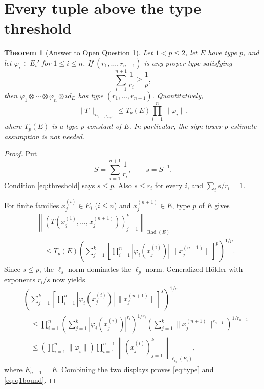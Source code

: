 \documentclass[11pt]{article}
\newtheorem{theorem}{Theorem}
\newcommand{\Rad}{\operatorname{Rad}}
\newcommand{\type}{\tau}
\begin{document}
\section{Every tuple above the type threshold}

\begin{theorem}[Answer to Open Question 1]\label{thm:q1}
Let $1<p\le2$, let $E$ have type $p$, and let
$\varphi_i\in E_i'$ for $1\le i\le n$.  If
$(r_1,\ldots,r_{n+1})$ is any proper type satisfying
\begin{equation}\label{eq:threshold}
 \sum_{i=1}^{n+1}\frac1{r_i}\ge\frac1p,
\end{equation}
then $\varphi_1\otimes\cdots\otimes\varphi_n\otimes id_E$ has type
$(r_1,\ldots,r_{n+1})$.  Quantitatively,
\begin{equation}\label{eq:q1bound}
 \|T\|_{\type_{r_1,\ldots,r_{n+1}}}
 \le T_p(E)\prod_{i=1}^n\|\varphi_i\|,
\end{equation}
where $T_p(E)$ is a type-$p$ constant of $E$.
In particular, the sign lower $p$-estimate assumption is not needed.
\end{theorem}

\begin{proof}
Put
\[
 S=\sum_{i=1}^{n+1}\frac1{r_i},\qquad s=S^{-1}.
\]
Condition \eqref{eq:threshold} says $s\le p$.  Also $s\le r_i$ for every
$i$, and $\sum_i s/r_i=1$.

For finite families $x_j^{(i)}\in E_i$ ($i\le n$) and
$x_j^{(n+1)}\in E$, type $p$ of $E$ gives
\begin{align*}
 &\left\|\left(T(x_j^{(1)},\ldots,x_j^{(n+1)})\right)_{j=1}^k
 \right\|_{\Rad(E)}\\
 &\quad\le T_p(E)
 \left(\sum_{j=1}^k
 \left[\prod_{i=1}^n|\varphi_i(x_j^{(i)})|\,
       \|x_j^{(n+1)}\|\right]^p\right)^{1/p}.
\end{align*}
Since $s\le p$, the $\ell_s$ norm dominates the $\ell_p$ norm.  Generalized
H\"older with exponents $r_i/s$ now yields
\begin{align*}
 &\left(\sum_{j=1}^k
 \left[\prod_{i=1}^n|\varphi_i(x_j^{(i)})|\,
       \|x_j^{(n+1)}\|\right]^s\right)^{1/s}\\
 &\quad\le
 \prod_{i=1}^n\left(\sum_{j=1}^k
 |\varphi_i(x_j^{(i)})|^{r_i}\right)^{1/r_i}
 \left(\sum_{j=1}^k\|x_j^{(n+1)}\|^{r_{n+1}}
 \right)^{1/r_{n+1}}\\
 &\quad\le\left(\prod_{i=1}^n\|\varphi_i\|\right)
 \prod_{i=1}^{n+1}
 \left\|(x_j^{(i)})_{j=1}^k\right\|_{\ell_{r_i}(E_i)},
\end{align*}
where $E_{n+1}=E$.  Combining the two displays proves
\eqref{eq:type} and \eqref{eq:q1bound}.
\end{proof}
\end{document}

